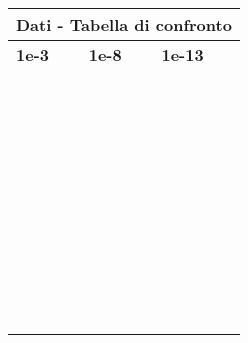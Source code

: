 \documentclass[10pt,a4paper]{article}
\begin{document}
\begin{center}
  \begin{tabular}{ |p{2.7cm}||p{2.7cm}|p{2.7cm}| }
    \multicolumn{3}{|c|}{ \textbf{Dati - Tabella di confronto}} \\
    \hline
    \textbf{1e-3} & \textbf{1e-8} & \textbf{1e-13}      \\
    \hline
    & & \\
    & & \\
    & & \\
    & & \\
    & & \\
    & & \\
    & & \\
    & & \\
    & & \\
    & & \\
    & & \\
    & & \\
    & & \\
    & & \\
    & & \\
    & & \\
    & & \\
    & & \\
    & & \\
    & & \\
    & & \\
    & & \\
    & & \\
    & & \\
    & & \\
    & & \\
    & & \\
    & & \\
    & & \\
    & & \\
    & & \\
    & & \\
    & & \\
    & & \\
    & & \\
    & & \\
    & & \\
    & & \\
    & & \\
    & & \\
    & & \\
    & & \\
    & & \\
    & & \\

\end{tabular}
\end{center}
\end{document}
